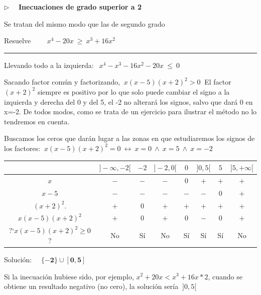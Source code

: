 \vspace{5mm}
\begin{large}
$\triangleright \quad $ \textbf{Inecuaciones de grado superior a 2}	
\end{large}
\vspace{5mm}

Se tratan del mismo modo que las de segundo grado

\begin{miejercicio}

Resuelve $\qquad x^4-20x \ \geq \ x^3+16x^2$

\rule{250pt}{0.1pt}	

\vspace{5mm} Llevando todo a la izquierda: $\ \ x^4-x^3-16x^2-20x \ \leqslant \ 0$

\vspace{2mm} Sacando factor común y factorizando, $\ x(x-5)(x+2)^2 >0\ $ \textcolor{gris}{El factor $(x+2)^2$ siempre es positivo por lo que solo puede cambiar el signo a la izquierda y derecha del 0 y del 5, el -2 no alterará los signos, salvo que dará 0 en x=-2. De todos modos, como se trata de un ejercicio para ilustrar el método no lo tendremos en cuenta.}

\vspace{2mm} Buscamos los ceros que darán lugar a las zonas en que estudiaremos los signos de los factores: $\ x(x-5)(x+2)^2=0 \ \leftrightarrow \ x=0\ \wedge \ x=5 \ \wedge \ x=-2$

\begin{table}[H]
\centering
\begin{tabular}{c|c|c|c|c|c|c|c|}
 & $]-\infty,-2[$ & $-2$ & $]-2,0[$ & $0$ & $]0,5[$ & $5$ & $]5,+\infty[$ \\ \hline
$x$            & $-$ & $-$ & $-$ & 0 & $+$ & $+$ & $+$ \\ \hline
$x-5$          & $-$ & $-$ & $-$ & $-$ & $-$ & 0 & $+$ \\ \hline
$(x+2)^2$.     & $+$ & 0 & $+$ & $+$ & $+$ & $+$ & $+$ \\ \hline
$x(x-5)(x+2)^2$ & $+$ & 0 & $+$ & 0 & $-$ & 0 & $+$ \\ \hline
?`$x(x-5)(x+2)^2\geqslant 0$? & No & Sí & No & Sí & Sí & Sí & No \\ \hline
\end{tabular}
\end{table}
Solución: $\quad \boldsymbol{ \{-2\} \cup [0,5]}$

\vspace{2mm} Si la inecuación hubiese sido, por ejemplo, $x^2+20x<x^3+16x*2$, cuando se obtiene un resultado negativo (no cero), la solución sería $\ ]0,5[$
\end{miejercicio}


